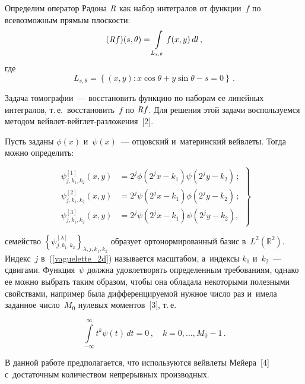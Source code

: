 \begin{multicols}{2}
Определим оператор Радона $\textit{R}$ как набор интегралов от функции~$f$
по всевозможным прямым плос\-кости:
\begin{equation*}
(\textit{R} f)(s,\theta) = \int\limits_{L_{s,\theta}} f(x,y)\, d l\,,
\end{equation*}
где
\begin{equation*}
{L_{s,\theta}} = \left\{(x,y)\colon x\cos\theta + y\sin\theta - s = 0 \right\}\,.
\end{equation*}

Задача томографии~--- восстановить функцию по наборам ее линейных интегралов,
 т.\,е.\ восстановить~$f$ по $\textit{R} f$. Для решения этой
 задачи воспользуемся методом вейв\-лет-вейг\-лет-раз\-ло\-же\-ния~[2].

Пусть заданы $\phi(x)$ и~$\psi(x)$~--- отцовский и~материнский вейвлеты.
Тогда можно определить:

\vspace*{2pt}

\noindent
\begin{equation}
\left.
\begin{array}{rl}
\psi_{j,k_1,k_2}^{[1]} (x,y) &= 2^j \phi(2^j x - k_1) \psi(2^j y - k_2)\,;\\[9pt]
\psi_{j,k_1,k_2}^{[2]} (x,y) &= 2^j \psi(2^j x - k_1) \phi(2^j y - k_2)\,;\\[9pt]
\psi_{j,k_1,k_2}^{[3]} (x,y) &= 2^j \psi(2^j x - k_1) \psi(2^j y - k_2),
\end{array}
\right\}
\label{vaguelette_2d}
\end{equation}

\vspace*{-2pt}

\noindent
семейство $\left\{\psi^{[\lambda]}_{j,k_1,k_2}\right\}_{\lambda,j,k_1,k_2}$
образует ортонормированный базис в~$L^2(\mathbb{R}^2)$. Индекс~$j$
в~(\ref{vaguelette_2d}) называется масштабом, а~индексы $k_1$ и~$k_2$~---
сдвигами. Функция~$\psi$ должна удовлетворять определенным
требованиям, однако ее можно выбрать таким образом, чтобы она
обладала некоторыми полезными свойствами, например была
дифференцируемой нужное число раз и~имела заданное число~$M_0$
нулевых моментов~[3], т.\,е.

\vspace*{4pt}

\noindent
$$
\int\limits_{-\infty}^{\infty}t^k\psi(t)\,dt=0\,,\quad k=0,\ldots,M_0-1\,.
$$

\vspace*{-2pt}

\noindent
В данной работе предполагается, что используются вейвлеты Мейера~[4]
с~достаточным количеством непрерывных производных.


\end{multicols}
